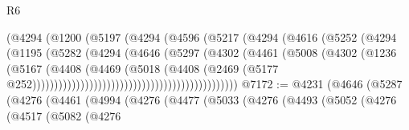 \begin{lexlean}{R6}
\begin{coremodule}
                                            (@4294
                                              (@1200
                                                (@5197
                                                  (@4294
                                                    (@4596
                                                      (@5217
                                                        (@4294
                                                          (@4616
                                                            (@5252
                                                              (@4294
                                                                (@1195
                                                                  (@5282
                                                                    (@4294
                                                                      (@4646
                                                                        (@5297
                                                                          (@4302
                                                                            (@4461
                                                                              (@5008
                                                                                (@4302
                                                                                  (@1236
                                                                                    (@5167
                                                                                      (@4408
                                                                                        (@4469
                                                                                          (@5018
                                                                                            (@4408
                                                                                              (@2469
                                                                                                (@5177
                                                                                                  @252)))))))))))))))))))))))))))))))))))))))))))))))
@7172 := @4231
    (@4646
      (@5287
        (@4276
          (@4461
            (@4994
              (@4276
                (@4477
                  (@5033
                    (@4276
                      (@4493
                        (@5052
                          (@4276
                            (@4517
                              (@5082
                                (@4276

\end{coremodule}
\end{lexlean}
